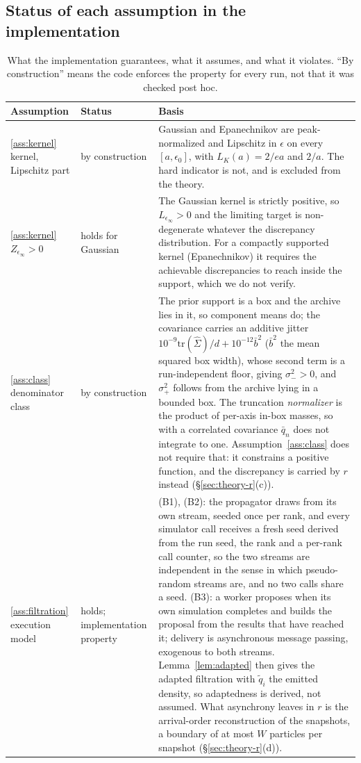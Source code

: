 \documentclass[10pt]{article}
\theoremstyle{plain}
\theoremstyle{definition}
\begin{document}
\subsection{Status of each assumption in the implementation}\label{app:theory-status}
\begin{table}[h]
\caption{What the implementation guarantees, what it assumes, and what it violates. ``By construction'' means the code enforces the property for every run, not that it was checked post hoc.}\label{tab:assumption-status}
\centering
\footnotesize
\setlength{\tabcolsep}{3pt}
\begin{tabular}{@{}p{}p{}p{}@{}}
\toprule
Assumption & Status & Basis \\
\midrule
\ref{ass:kernel} kernel, Lipschitz part & by construction & Gaussian and Epanechnikov are peak-normalized and Lipschitz in $\epsilon$ on every $[a,\epsilon_0]$, with $L_K(a)=2/ea$ and $2/a$. The hard indicator is not, and is excluded from the theory. \\
\ref{ass:kernel} $Z_{\epsilon_\infty}>0$ & holds for Gaussian & The Gaussian kernel is strictly positive, so $L_{\epsilon_\infty}>0$ and the limiting target is non-degenerate whatever the discrepancy distribution. For a compactly supported kernel (Epanechnikov) it requires the achievable discrepancies to reach inside the support, which we do not verify. \\
\ref{ass:class} denominator class & by construction & The prior support is a box and the archive lies in it, so component means do; the covariance carries an additive jitter $10^{-9}\mathrm{tr}(\widehat\Sigma)/d+10^{-12}\bar b^2$ ($\bar b^2$ the mean squared box width), whose second term is a run-independent floor, giving $\sigma_-^2>0$, and $\sigma_+^2$ follows from the archive lying in a bounded box. The truncation \emph{normalizer} is the product of per-axis in-box masses, so with a correlated covariance $\bar q_n$ does not integrate to one. Assumption~\ref{ass:class} does not require that: it constrains a positive function, and the discrepancy is carried by $r$ instead (\S\ref{sec:theory-r}(c)). \\
\ref{ass:filtration} execution model & holds; implementation property & (B1), (B2): the propagator draws from its own stream, seeded once per rank, and every simulator call receives a fresh seed derived from the run seed, the rank and a per-rank call counter, so the two streams are independent in the sense in which pseudo-random streams are, and no two calls share a seed. (B3): a worker proposes when its own simulation completes and builds the proposal from the results that have reached it; delivery is asynchronous message passing, exogenous to both streams. Lemma~\ref{lem:adapted} then gives the adapted filtration with $\tilde q_i$ the emitted density, so adaptedness is derived, not assumed. What asynchrony leaves in $r$ is the arrival-order reconstruction of the snapshots, a boundary of at most $W$ particles per snapshot (\S\ref{sec:theory-r}(d)). \\

\end{tabular}
\end{table}
\end{document}
